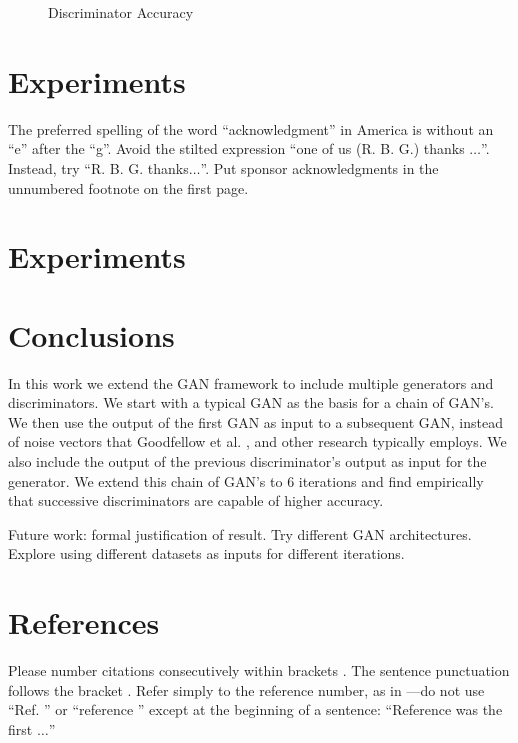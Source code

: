 \documentclass[conference]{IEEEtran}
\begin{document}
\begin{figure}[htpb]
\caption{Discriminator Accuracy}
\label{discAcc}
\end{figure}
\section{Experiments}

The preferred spelling of the word ``acknowledgment'' in America is without 
an ``e'' after the ``g''. Avoid the stilted expression ``one of us (R. B. 
G.) thanks $\ldots$''. Instead, try ``R. B. G. thanks$\ldots$''. Put sponsor 
acknowledgments in the unnumbered footnote on the first page.

\section{Experiments}
\section{Conclusions}
In this work we extend the GAN framework to include
multiple generators and discriminators.  We start with a typical GAN as the
basis for a chain of GAN's.  We then use the output of the first GAN as 
input to a subsequent GAN, instead of noise vectors that Goodfellow et al.
\cite{gan}, and other research typically employs.  We also include the output of
the previous discriminator's output as input for the generator.  We extend this
chain of GAN's to 6 iterations and find empirically that successive discriminators 
are capable of higher accuracy.   

Future work: formal justification of result. Try different GAN architectures.
Explore using different datasets as inputs for different iterations.
\section*{References}

Please number citations consecutively within brackets \cite{b1}. The 
sentence punctuation follows the bracket \cite{b2}. Refer simply to the reference 
number, as in \cite{b3}---do not use ``Ref. \cite{b3}'' or ``reference \cite{b3}'' except at 
the beginning of a sentence: ``Reference \cite{b3} was the first $\ldots$''
\end{document}
